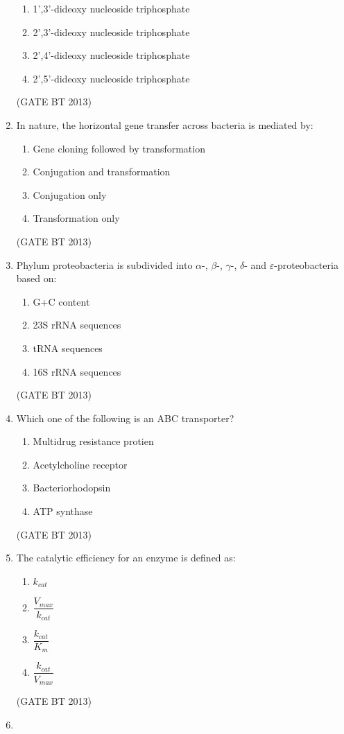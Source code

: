 \documentclass[journal,12pt,onecolumn]{IEEEtran}
\theoremstyle{remark}
\begin{document}
\begin{enumerate}
\begin{enumerate}
    \item 1',3'-dideoxy nucleoside triphosphate
    \item 2',3'-dideoxy nucleoside triphosphate
    \item 2',4'-dideoxy nucleoside triphosphate
    \item 2',5'-dideoxy nucleoside triphosphate
\end{enumerate}
\hfill (GATE BT 2013)
\item 

In nature, the horizontal gene transfer across bacteria is mediated by:

\begin{enumerate}
    \item Gene cloning followed by transformation
    \item Conjugation and transformation
    \item Conjugation only
    \item Transformation only
\end{enumerate} 
\hfill (GATE BT 2013)
\item 

Phylum proteobacteria is subdivided into $\alpha$-, $\beta$-, $\gamma$-, $\delta$- and $\varepsilon$-proteobacteria based on:

\begin{enumerate}
    \item G+C content
    \item 23S rRNA sequences
    \item tRNA sequences
    \item 16S rRNA sequences
\end{enumerate}
\hfill (GATE BT 2013)
\item 

Which one of the following is an ABC transporter?

\begin{enumerate}
    \item Multidrug resistance protien 
    \item Acetylcholine receptor
    \item Bacteriorhodopsin
    \item ATP synthase
\end{enumerate} 
\hfill (GATE BT 2013)
\item 

The catalytic efficiency for an enzyme is defined as:

\begin{enumerate}
    \item $k_{cat}$
    \item $\dfrac{V_{max}}{k_{cat}}$
    \item {$\dfrac{k_{cat}}{K_m}$} 
    \item $\dfrac{k_{cat}}{V_{max}}$
\end{enumerate} 
\hfill (GATE BT 2013)
\item 


\end{enumerate}
\end{document}
